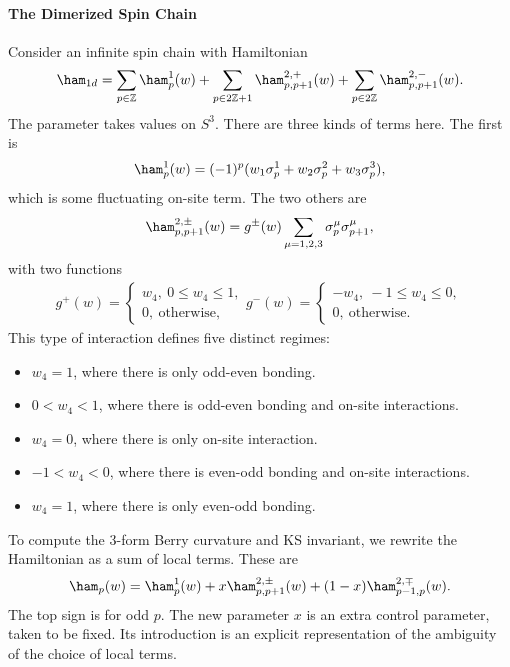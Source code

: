 \paragraph{The Dimerized Spin Chain}
Consider an infinite spin chain with Hamiltonian
\begin{align*}
	\ham_{1d} = \sum\limits_{p\in\mathbb{Z}}\ham^{1}_{p}(w) + \sum\limits_{p\in 2\mathbb{Z} + 1}\ham^{2, +}_{p, p + 1}(w) + \sum\limits_{p\in 2\mathbb{Z}}\ham^{2, -}_{p, p + 1}(w).
\end{align*}
The parameter takes values on $S^{3}$. There are three kinds of terms here. The first is
\begin{align*}
	\ham^{1}_{p}(w) = (-1)^{p}(w_{1}\sigma_{p}^{1} + w_{2}\sigma_{p}^{2}+ w_{3}\sigma_{p}^{3}),
\end{align*}
which is some fluctuating on-site term. The two others are
\begin{align*}
	\ham^{2, \pm}_{p, p + 1}(w) = g^{\pm}(w)\sum\limits_{\mu = 1, 2, 3}\sigma_{p}^{\mu}\sigma_{p + 1}^{\mu},
\end{align*}
with two functions
\begin{align*}
	g^{+}(w) = \begin{cases}
		w_{4},\ 0\leq w_{4} \leq 1, \\
		0,\ \text{otherwise},
	\end{cases}
	g^{-}(w) = \begin{cases}
		-w_{4},\ -1\leq w_{4} \leq 0, \\
		0,\ \text{otherwise}.
	\end{cases}
\end{align*}
This type of interaction defines five distinct regimes:
\begin{itemize}
	\item $w_{4} = 1$, where there is only odd-even bonding.
	\item $0 < w_{4} < 1$, where there is odd-even bonding and on-site interactions.
	\item $w_{4} = 0$, where there is only on-site interaction.
	\item $-1 < w_{4} < 0$, where there is even-odd bonding and on-site interactions.
	\item $w_{4} = 1$, where there is only even-odd bonding.
\end{itemize}

To compute the 3-form Berry curvature and KS invariant, we rewrite the Hamiltonian as a sum of local terms. These are
\begin{align*}
	\ham_{p}(w) = \ham^{1}_{p}(w) + x\ham^{2, \pm}_{p, p + 1}(w) + (1 - x)\ham^{2, \mp}_{p - 1, p}(w).
\end{align*}
The top sign is for odd $p$. The new parameter $x$ is an extra control parameter, taken to be fixed. Its introduction is an explicit representation of the ambiguity of the choice of local terms.

